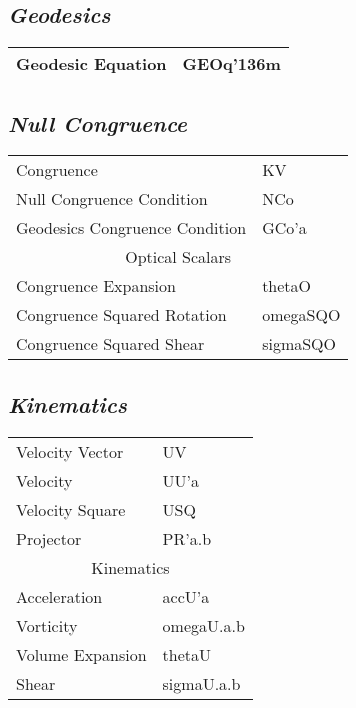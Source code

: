 \documentclass[twocolumn]{article}
\newcommand{\grgtt}{\ttfamily}
\renewcommand{\tt}{\grgtt}
\def\^{{\tt \char'136}}                     %
\begin{document}
\subsection{\sf\slshape  Geodesics}
\begin{tabular}{|l|l|}\hline
\tt    Geodesic Equation  &\tt   GEOq\^m\\
\hline\end{tabular}

\subsection{\sf\slshape  Null Congruence}
\begin{tabular}{|l|l|}\hline
\tt    Congruence                    &\tt  KV\\
\tt    Null Congruence Condition     &\tt  NCo\\
\tt    Geodesics Congruence Condition&\tt  GCo'a\\
\hline
\multicolumn{2}{|c|}{\tt    Optical Scalars}\\
\tt    Congruence Expansion          &\tt  thetaO\\
\tt    Congruence Squared Rotation   &\tt  omegaSQO\\
\tt    Congruence Squared Shear      &\tt  sigmaSQO\\
\hline\end{tabular}

\subsection{\sf\slshape  Kinematics}
\begin{tabular}{|l|l|}\hline
\tt    Velocity Vector  &\tt   UV\\
\tt    Velocity         &\tt   UU'a\\
\tt    Velocity Square  &\tt   USQ\\
\tt    Projector        &\tt   PR'a.b\\
\hline
\multicolumn{2}{|c|}{\tt    Kinematics}\\
\tt    Acceleration     &\tt   accU'a\\
\tt    Vorticity        &\tt   omegaU.a.b\\
\tt    Volume Expansion &\tt   thetaU\\
\tt    Shear            &\tt   sigmaU.a.b\\
\hline\end{tabular}
\end{document}
